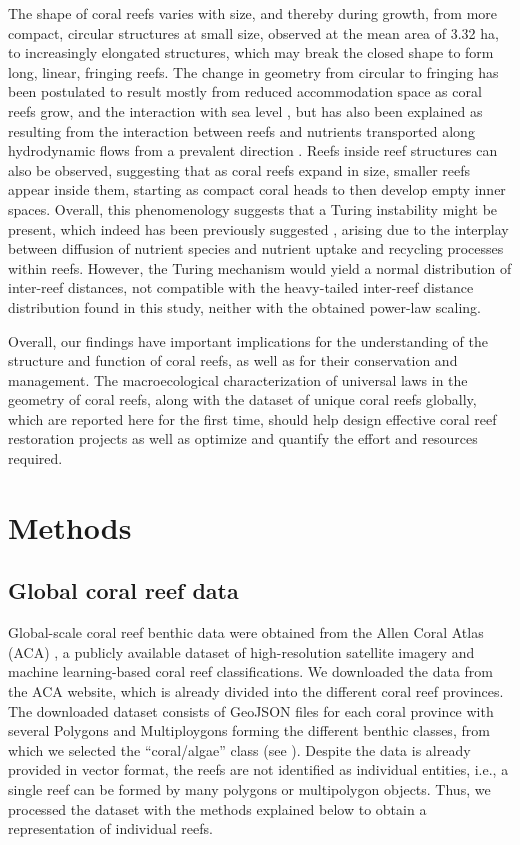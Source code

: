The shape of coral reefs varies with size, and thereby during growth, from
more compact, circular structures at small size, observed at the mean area of
3.32 ha, to increasingly elongated structures, which may break the closed shape
to form long, linear, fringing reefs. The change in geometry from circular to
fringing has been postulated to result mostly from reduced accommodation space
as coral reefs grow, and the interaction with sea level \cite{Kennedy2002}, but
has also been explained as resulting from the interaction between reefs and
nutrients transported along hydrodynamic flows from a prevalent direction
\cite{Mistr2003}. Reefs inside reef structures can also be observed, suggesting
that as coral reefs expand in size, smaller reefs appear inside them, starting
as compact coral heads to then develop empty inner spaces. Overall, this
phenomenology suggests that a Turing instability
\cite{turing1952chemical,CrossGreensidebook} might be present, which indeed has
been previously suggested \cite{Mistr2003}, arising due to the interplay
between diffusion of nutrient species and nutrient uptake and recycling
processes within reefs. However, the Turing mechanism would yield a normal
distribution of inter-reef distances, not compatible with the heavy-tailed
inter-reef distance distribution found in this study, neither with the obtained
power-law scaling.

Overall, our findings have important implications for the understanding of the
structure and function of coral reefs, as well as for their conservation and
management. The macroecological characterization of universal laws in the
geometry of coral reefs, along with the dataset of unique coral reefs globally,
which are reported here for the first time, should help design effective coral
reef restoration projects as well as optimize and quantify the effort and
resources required.

\section{Methods}

\subsection{Global coral reef data}

Global-scale coral reef benthic data were obtained from the Allen Coral
Atlas (ACA) \cite{allen-coral-atlas}, a publicly available dataset of
high-resolution satellite imagery and machine learning-based coral reef
classifications. We downloaded the data from the ACA website, which is already
divided into the different coral reef provinces. The downloaded dataset
consists of GeoJSON files for each coral province with several Polygons and
Multiploygons forming the different benthic classes, from which we selected the
``coral/algae'' class (see \cite{allen-coral-atlas}). Despite the data is
already provided in vector format, the reefs are not identified as individual
entities, i.e., a single reef can be formed by many polygons or multipolygon
objects. Thus, we processed the dataset with the methods explained below to
obtain a representation of individual reefs.

